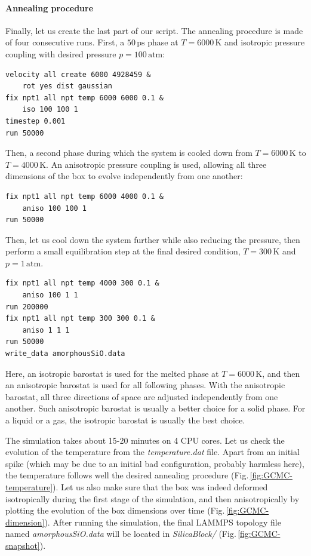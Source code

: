 \documentclass[9pt,tutorial]{livecoms}
\begin{document}
\paragraph{Annealing procedure}
Finally, let us create the last part of our script. The annealing procedure is made of four consecutive runs.
First, a $50\,\text{ps}$ phase at $T = 6000\,\text{K}$ and isotropic pressure coupling with desired pressure $p = 100\,\text{atm}$:
{\normalsize \begin{verbatim}
velocity all create 6000 4928459 &
    rot yes dist gaussian
fix npt1 all npt temp 6000 6000 0.1 &
    iso 100 100 1
timestep 0.001
run 50000
\end{verbatim}}
Then, a second phase during which the system is cooled down from $T = 6000\,\text{K}$ to $T = 4000\,\text{K}$. An anisotropic pressure coupling is used, allowing all three dimensions of the box to evolve independently from one another:
{\normalsize \begin{verbatim}
fix npt1 all npt temp 6000 4000 0.1 &
    aniso 100 100 1
run 50000
\end{verbatim}}
Then, let us cool down the system further while also reducing the pressure, then perform a small equilibration step at the final desired condition, $T = 300\,\text{K}$ and $p = 1\,\text{atm}$.
{\normalsize \begin{verbatim}
fix npt1 all npt temp 4000 300 0.1 &
    aniso 100 1 1
run 200000
fix npt1 all npt temp 300 300 0.1 &
    aniso 1 1 1
run 50000
write_data amorphousSiO.data
\end{verbatim}}
Here, an isotropic barostat is used for the melted phase at $T = 6000\,\text{K}$, and then an anisotropic barostat is used for all following phases. With the anisotropic barostat, all three directions of space are adjusted independently from one another. Such anisotropic barostat is usually a better choice for a solid phase. For a liquid or a gas, the isotropic barostat is usually the best choice.

The simulation takes about 15-20 minutes on 4 CPU cores. Let us check the evolution of the temperature from the \textit{temperature.dat} file. Apart from an initial spike (which may be due to an initial bad configuration, probably harmless here),
the temperature follows well the desired annealing procedure  (Fig.\,\ref{fig:GCMC-temperature}). Let us also make sure that the box was indeed deformed isotropically during the first stage of the simulation, and then anisotropically by plotting the evolution of the box dimensions over time (Fig.\,\ref{fig:GCMC-dimension}). After running the simulation, the final LAMMPS topology file named \textit{amorphousSiO.data} will be located in \textit{SilicaBlock/}  (Fig.\,\ref{fig:GCMC-snapshot}).
\end{document}
